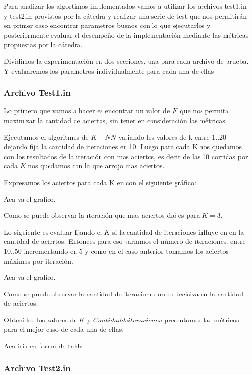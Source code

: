 Para analizar los algortimos implementados vamos a utilizar los archivos test1.in y test2.in provistos por la cátedra y realizar una serie de test que nos permitirán en primer caso encontrar parametros buenos con lo que ejecutarlos y posteriormente evaluar el desempeño de la implementación mediante las métricas propuestas por la cátedra.

Dividimos la experimentación en dos secciones, una para cada archivo de prueba. Y evaluaremos los parametros individualmente para cada una de ellas


\subsubsection {Archivo Test1.in}


Lo primero que vamos a hacer es encontrar un valor de $K$ que nos permita maximizar la cantidad de aciertos, sin tener en consideración las métricas.

Ejecutamos el algoritmos de $K-NN$ variando los valores de k entre {1..20} dejando fija la cantidad de iteraciones en 10. Luego para cada K nos quedamos con los resultados de la iteración con mas aciertos, es decir de las 10 corridas por cada $K$ nos quedamos con la que arrojo mas aciertos.

Expresamos los aciertos para cada K en con el siguiente gráfico:

Aca va el grafico.

Como se puede observar la iteración que mas aciertos dió es para $K = 3$.

Lo siguiente es evaluar fijando el $K$ si la cantidad de iteraciones influye en en la cantidad de aciertos. Entonces para eso variamos el número de iteraciones, entre {10..50} incrementando en 5 y como en el caso anterior tomamos los aciertos máximos por iteración.

Aca va el grafico.

Como se puede observar la cantidad de iteraciones no es decisiva en la cantidad de aciertos.

Obtenidos los valores de $K$ y $Cantidad de iteraciones$ presentamos las métricas para el mejor caso de cada una de ellas.

Aca iria en forma de tabla





\subsubsection {Archivo Test2.in}




